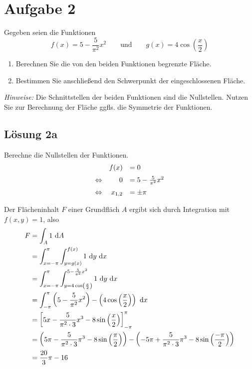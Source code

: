 \documentclass[main.tex]{subfiles}
\begin{document}
\section{Aufgabe 2}
Gegeben seien die Funktionen
\[
    f(x) = 5 - \frac{5}{\pi^2} x^2
    \qquad \mbox{und} \qquad
    g(x) = 4 \cos \left( \frac{x}{2} \right)
\]
\begin{enumerate}
\item Berechnen Sie die von den beiden Funktionen begrenzte Fläche.
\item Bestimmen Sie anschließend den Schwerpunkt der eingeschlossenen Fläche.
\end{enumerate}
\textit{Hinweise:} Die Schnittstellen der beiden Funktionen sind die Nullstellen. Nutzen Sie zur Berechnung der Fläche ggfls. die Symmetrie der Funktionen.

\subsection{Lösung 2a}

Berechne die Nullstellen der Funktionen.
\begin{equation*}
    \begin{array}[pos]{lrl}
                         & f(x)    &= 0\\[2mm]
        \Leftrightarrow  & 0       &= 5 - \frac{5}{\pi^2} x^2 \\[2mm]
        \Leftrightarrow  & x_{1,2} &= \pm \pi \\
    \end{array}
\end{equation*}


Der Flächeninhalt $F$ einer Grundfläch $A$ ergibt sich durch Integration mit $f(x,y) = 1$, also
\begin{align*}
    F &= \int_{A} 1 ~\mathrm{d}A\\
      &= \int_{x=-\pi}^{\pi} \int_{y=g(x)}^{f(x)} 1 ~\mathrm{d}y ~\mathrm{d}x \\
      &= \int_{x=-\pi}^{\pi} \int_{y=4 \cos \left( \frac{x}{2} \right)}^{5 - \frac{5}{\pi^2} x^2} 1 ~\mathrm{d}y ~\mathrm{d}x \\
      &= \int_{-\pi}^{\pi} \left(5 - \frac{5}{\pi^2} x^2\right) - \left(4 \cos \left(\frac{x}{2} \right)\right) ~\mathrm{d}x \\
      &= \left[5x - \frac{5}{\pi^2\cdot 3} x^3 - 8 \sin \left(\frac{x}{2} \right)\right]_{-\pi}^{\pi} \\
      &= \left(5\pi - \frac{5}{\pi^2\cdot 3} \pi^3 - 8 \sin \left(\frac{\pi}{2} \right)\right) - \left(-5\pi + \frac{5}{\pi^2\cdot 3} \pi^3 - 8 \sin \left(\frac{-\pi}{2} \right)\right) \\
      &= \frac{20}{3} \pi - 16 \\
\end{align*}
\end{document}

